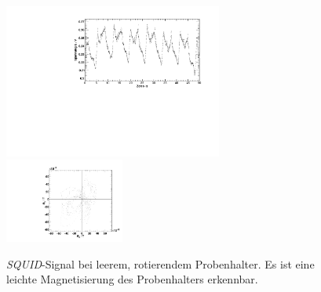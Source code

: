 \begin{figure}[H]
\begin{center}
  \includegraphics[width=0.64\textwidth]{../img/emptyHolder.pdf}
  \includegraphics[width=0.35\textwidth]{../img/polar_emptyHolder.pdf}
  \caption{\emph{SQUID}-Signal bei leerem, rotierendem Probenhalter. Es ist eine leichte Magnetisierung des
  Probenhalters erkennbar.}
  \label{img:holder}
\end{center}
\end{figure}

